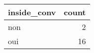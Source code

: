 
\begin{tabular}{l|r}
\hline
inside\_conv & count\\
\hline
non & 2\\
\hline
oui & 16\\
\hline
\end{tabular}
